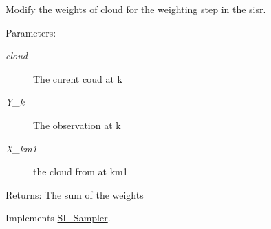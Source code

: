 Modify the weights of cloud for the weighting step in the sisr. 

\begin{Desc}
\item[Parameters:]
\begin{description}
\item[{\em cloud}]The curent coud at k \item[{\em Y\_\-k}]The observation at k \item[{\em X\_\-km1}]the cloud from at km1\end{description}
\end{Desc}
\begin{Desc}
\item[Returns:]The sum of the weights \end{Desc}


Implements \hyperlink{class_s_i___sampler_5c3a3547060d91febd3ef61969756ab6}{SI\_\-Sampler}.